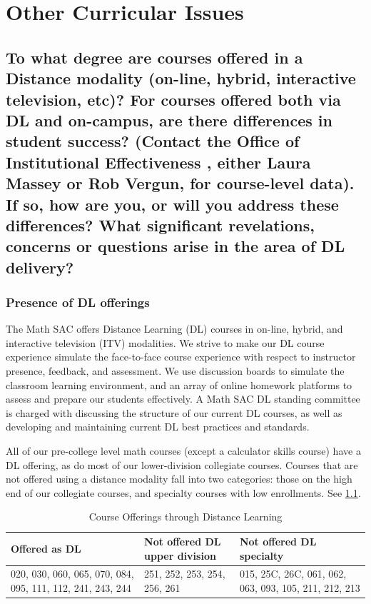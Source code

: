 \chapter{Other  Curricular Issues}
\section[Distance education]{To what degree are courses offered in a Distance modality (on-line, hybrid, interactive television, etc)? For courses offered both via DL and on-campus, are there differences in student success? (Contact the Office of Institutional Effectiveness , either Laura Massey or Rob Vergun,  for course-level data). If so, how are you, or will you address these differences? What significant revelations, concerns or questions arise in the area of DL delivery?}

\subsection{Presence of DL offerings}
The Math SAC offers Distance Learning (DL) courses in on-line, hybrid, and interactive television (ITV) modalities.  We strive to make our DL course experience simulate the face-to-face course experience with respect to instructor presence, feedback, and assessment. We use discussion boards to simulate the classroom learning environment, and an array of online homework platforms to assess and prepare our students effectively. A Math SAC DL standing committee is charged with discussing the structure of our current DL courses, as well as developing and maintaining current DL best practices and standards.

All of our pre-college level math courses (except a calculator skills course) have a DL offering, as do most of our lower-division collegiate courses.  Courses that are not offered using a distance modality fall into two categories: those on the high end of our collegiate courses, and specialty courses with low enrollments. See \cref{tab:sec3:DLofferings}.

\begin{table}
\caption{Course Offerings through Distance Learning}\label{tab:sec3:DLofferings}
\centering
\begin{tabular}{p{1in}p{1in}p{1in}}
\toprule
Offered as DL & Not offered  DL upper division & Not offered  DL specialty\\
\midrule
020, 030, 060, 065, 070, 084, 095, 111, 112, 241, 243, 244&
251, 252, 253, 254, 256, 261&
015, 25C, 26C, 061, 062, 063, 093, 105, 211, 212, 213\\
\bottomrule
\end{tabular}
\end{table}

